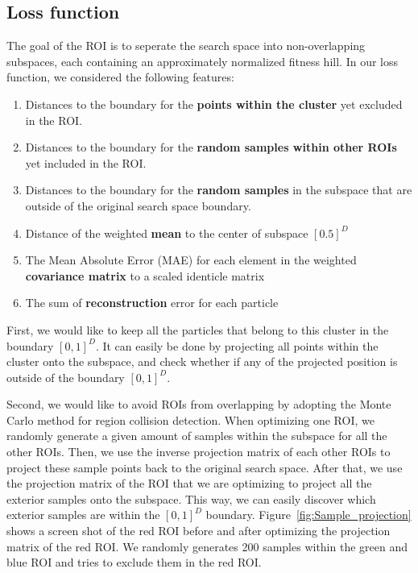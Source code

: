 \subsection{Loss function}

The goal of the ROI is to seperate the search space into non-overlapping subspaces, 
each containing an approximately normalized fitness hill.
In our loss function, we considered the following features:
\begin{enumerate}
    \item Distances to the boundary for the \textbf{points within the cluster} yet excluded in the ROI.
    \item Distances to the boundary for the \textbf{random samples within other ROIs} yet included in the ROI.
    \item Distances to the boundary for the \textbf{random samples} in the subspace that are outside of the original search space boundary.
    \item Distance of the weighted \textbf{mean} to the center of subspace $[0.5]^D$
    \item The Mean Absolute Error (MAE) for each element in the weighted \textbf{covariance matrix} to a scaled identicle matrix
    \item The sum of \textbf{reconstruction} error for each particle 
\end{enumerate} 

First, we would like to keep all the particles that belong to this cluster in the boundary $[0,1]^D$.
It can easily be done by projecting all points within the cluster onto the subspace, 
and check whether if any of the projected position is outside of the boundary $[0,1]^D$.

Second, we would like to avoid ROIs from overlapping by adopting the Monte Carlo method for region collision detection. 
When optimizing one ROI, we randomly generate a given amount of samples within the subspace for all the other ROIs.
Then, we use the inverse projection matrix of each other ROIs to project these sample points back to the original search space.
After that, we use the projection matrix of the ROI that we are optimizing to project all the exterior samples onto the subspace.
This way, we can easily discover which exterior samples are within the $[0, 1]^D$ boundary.
Figure~\ref{fig:Sample_projection} shows a screen shot of the red ROI before and after optimizing the projection matrix of the red ROI.
We randomly generates 200 samples within the green and blue ROI and tries to exclude them in the red ROI.

